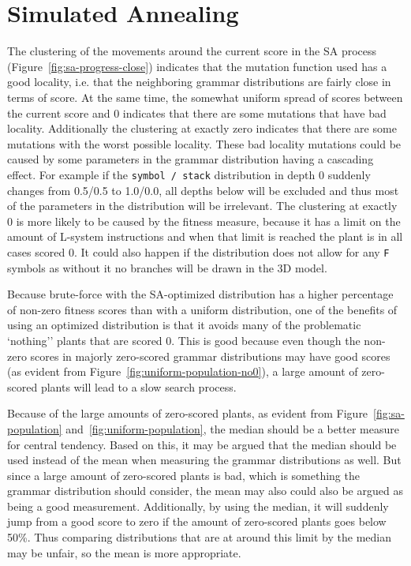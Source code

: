 \section{Simulated Annealing}
The clustering of the movements around the current score in the \gls{SA} process (Figure~\ref{fig:sa-progress-close}) indicates that the mutation function used has a good locality, i.e. that the neighboring grammar distributions are fairly close in terms of score.
At the same time, the somewhat uniform spread of scores between the current score and 0 indicates that there are some mutations that have bad locality.
Additionally the clustering at exactly zero indicates that there are some mutations with the worst possible locality.
These bad locality mutations could be caused by some parameters in the grammar distribution having a cascading effect.
For example if the \texttt{symbol / stack} distribution in depth 0 suddenly changes from 0.5/0.5 to 1.0/0.0, all depths below will be excluded and thus most of the parameters in the distribution will be irrelevant.
The clustering at exactly 0 is more likely to be caused by the fitness measure, because it has a limit on the amount of \gls{L-system} instructions and when that limit is reached the plant is in all cases scored 0.
It could also happen if the distribution does not allow for any \texttt{F} symbols as without it no branches will be drawn in the 3D model.

Because brute-force with the \gls{SA}-optimized distribution has a higher percentage of non-zero fitness scores than with a uniform distribution, one of the benefits of using an optimized distribution is that it avoids many of the problematic `nothing'' plants that are scored 0.
This is good because even though the non-zero scores in majorly zero-scored grammar distributions may have good scores (as evident from Figure~\ref{fig:uniform-population-no0}), a large amount of zero-scored plants will lead to a slow search process.

Because of the large amounts of zero-scored plants, as evident from Figure~\ref{fig:sa-population} and~\ref{fig:uniform-population}, the median should be a better measure for central tendency.
Based on this, it may be argued that the median should be used instead of the mean when measuring the grammar distributions as well.
But since a large amount of zero-scored plants is bad, which is something the grammar distribution should consider, the mean may also could also be argued as being a good measurement.
Additionally, by using the median, it will suddenly jump from a good score to zero if the amount of zero-scored plants goes below 50\%.
Thus comparing distributions that are at around this limit by the median may be unfair, so the mean is more appropriate.

